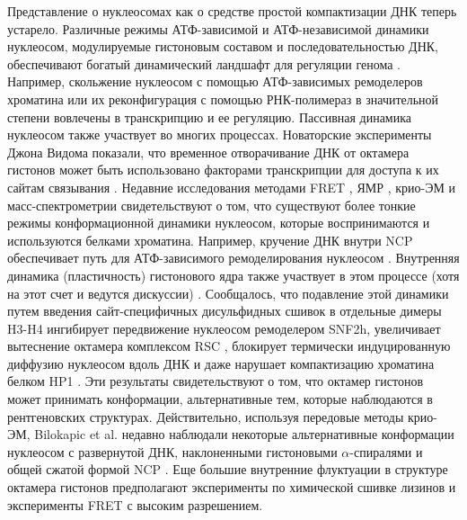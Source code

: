 Представление о нуклеосомах как о средстве простой компактизации ДНК теперь устарело.
Различные режимы АТФ-зависимой и АТФ-независимой динамики нуклеосом, модулируемые гистоновым составом и последовательностью ДНК, обеспечивают богатый динамический ландшафт для регуляции генома \cite{armeev_linking_2019}. Например, скольжение нуклеосом с помощью АТФ-зависимых ремоделеров хроматина \cite{paul_regulation_2018} или их реконфигурация с помощью РНК-полимераз \cite{kujirai_transcription_2020,gaykalova_structural_2015} в значительной степени вовлечены в транскрипцию и ее регуляцию. Пассивная динамика нуклеосом также участвует во многих процессах. Новаторские эксперименты Джона Видома показали, что временное отворачивание ДНК от октамера гистонов может быть использовано факторами транскрипции для доступа к их сайтам связывания \cite{li_rapid_2005}. Недавние исследования методами FRET \cite{gansen_high_2018,sabantsev_direct_2019}, ЯМР \cite{sinha_distortion_2017, kitevski-leblanc_investigating_2018}, крио-ЭМ \cite{li_mechanism_2019,bilokapic_structural_2018} и масс-спектрометрии\cite{hada_histone_2019,sanulli_hp1_2019,sinha_distortion_2017} свидетельствуют о том, что существуют более тонкие режимы конформационной динамики нуклеосом, которые воспринимаются и используются белками хроматина. Например, кручение ДНК внутри NCP обеспечивает путь для АТФ-зависимого ремоделирования нуклеосом \cite{bowman_remodeling_2019,li_mechanism_2019}. Внутренняя динамика (пластичность) гистонового ядра также участвует в этом процессе (хотя на этот счет и ведутся дискуссии) \cite{sinha_distortion_2017,yan_structures_2019,armache_cryo-em_2019}. Сообщалось, что подавление этой динамики путем введения сайт-специфичных дисульфидных сшивок в отдельные димеры H3-H4 ингибирует передвижение нуклеосом ремоделером SNF2h, увеличивает вытеснение октамера комплексом RSC \cite{sinha_distortion_2017}, блокирует термически индуцированную диффузию нуклеосом вдоль ДНК \cite{bilokapic_structural_2018} и даже нарушает компактизацию хроматина белком HP1 \cite{sanulli_hp1_2019}. Эти результаты свидетельствуют о том, что октамер гистонов может принимать конформации, альтернативные тем, которые наблюдаются в рентгеновских структурах. Действительно, используя передовые методы крио-ЭМ, Bilokapic et al. недавно наблюдали некоторые альтернативные конформации нуклеосом с развернутой ДНК, наклоненными гистоновыми $\alpha$-спиралями и общей сжатой формой NCP \cite{bilokapic_structural_2018,bilokapic_histone_2018}. Еще большие внутренние флуктуации в структуре октамера гистонов предполагают эксперименты по химической сшивке лизинов \cite{hada_histone_2019} и эксперименты FRET с высоким разрешением\cite{gansen_high_2018}.


